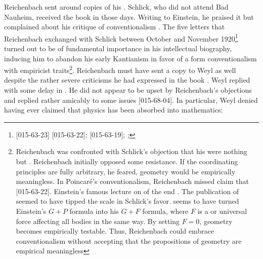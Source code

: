 \documentclass[final]{article}
\begin{document}
Reichenbach sent around copies of his  \citep{Reichenbach1920a}. Schlick, who did not attend Bad Nauheim, received the book in those days. Writing to Einstein, he praised it but complained about his critique of conventionalism . The five letters that Reichenbach exchanged with Schlick between October and November 1920\footnote{[015-63-23]
[015-63-22];
[015-63-19]; ; } turned out to be of fundamental importance in his intellectual biography, inducing him to abandon his early Kantianism in favor of a form conventionalism with empiricist traits\footnote{Reichenbach was confronted with Schlick's objection that his  were nothing but . Reichenbach initially opposed some resistance. If the coordinating principles are fully arbitrary, he feared, geometry would be empirically meaningless. In Poincaré's conventionalism, Reichenbach missed  claim that  [015-63-22]. Einstein's famous lecture on  of the end . The publication of \citet{Einstein1921} seemed to have tipped the scale in Schlick's favor. \citet{Reichenbach1922a} seems to have turned Einstein's $G+P$ formula into his $G + F$ formula, where $F$ is a  or universal force affecting all bodies in the same way. By setting $F=0$, geometry becomes empirically testable. Thus, Reichenbach could embrace conventionalism without accepting that the propositions of geometry are empirical meaningless}. Reichenbach must have sent a copy to Weyl as well despite the rather severe criticisms he had expressed in the book \citep{Rynasiewicz2005}. Weyl replied with some delay in . He did not appear to be upset by Reichenbach's objections and replied rather amicably to some issues  [015-68-04]. In particular, Weyl denied having ever claimed that physics has been absorbed into mathematics:
\end{document}
